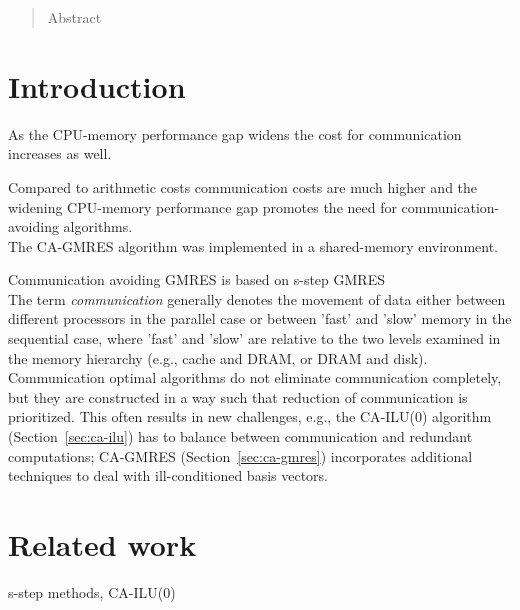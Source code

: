 \documentclass{scrartcl}
\numberwithin{equation}{section}
\begin{document}
\begin{abstract}
Abstract
\end{abstract}
\section{Introduction}
As the CPU-memory performance gap widens the cost for communication increases as well.

Compared to arithmetic costs communication costs are much higher and the widening CPU-memory performance gap promotes the need for communication-avoiding algorithms.\\

The CA-GMRES algorithm was implemented in a shared-memory environment.

Communication avoiding GMRES is based on s-step GMRES 
\cite{Erhel95aparallel}
\\

The term \textit{communication} generally denotes the movement of data either between different processors in the parallel case or between 'fast' and 'slow' memory in the sequential case, where 'fast' and 'slow' are relative to the two levels examined in the memory hierarchy (e.g., cache and DRAM, or DRAM and disk). Communication optimal algorithms do not eliminate communication completely, but they are constructed in a way such that reduction of communication is prioritized. This often results in new challenges, e.g., the  CA-ILU(0) algorithm (Section~\ref{sec:ca-ilu}) has to balance between communication and redundant computations; CA-GMRES (Section~\ref{sec:ca-gmres}) incorporates additional techniques to deal with ill-conditioned basis vectors.

\pagebreak
\section{Related work}
s-step methods, CA-ILU(0)
\pagebreak
\end{document}
